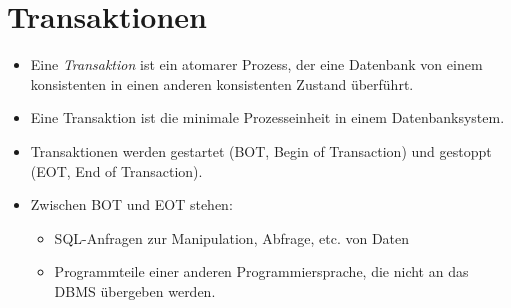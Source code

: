     \section{Transaktionen} %
    	\begin{itemize}
    		\item Eine \textit{Transaktion} ist ein atomarer Prozess, der eine Datenbank von einem konsistenten in einen anderen konsistenten Zustand überführt.
    		\item Eine Transaktion ist die minimale Prozesseinheit in einem Datenbanksystem.
    		\item Transaktionen werden gestartet (BOT, Begin of Transaction) und gestoppt (EOT, End of Transaction).
    		\item Zwischen BOT und EOT stehen:
    			\begin{itemize}
    				\item SQL-Anfragen zur Manipulation, Abfrage, etc. von Daten
    				\item Programmteile einer anderen Programmiersprache, die nicht an das DBMS übergeben werden.
    			\end{itemize}
    	\end{itemize}

